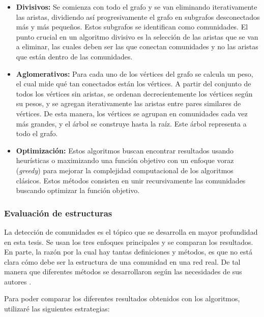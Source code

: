 \begin{enumerate}
\begin{itemize}
\item \textbf{Divisivos:} Se comienza con todo el grafo y se van eliminando iterativamente las aristas, dividiendo así progresivamente el grafo en subgrafos desconectados más y más pequeños. Estos subgrafos se identifican como comunidades. El punto crucial en un algoritmo divisivo es la selección de las aristas que se van a eliminar, las cuales deben ser las que conectan comunidades y no las aristas que están dentro de las comunidades. \cite{Radicchi2004DefiningNetworks,Girvan2002CommunityNetworks.,Newman2004FastNetworks}
\item \textbf{Aglomerativos:} Para cada uno de los vértices del grafo se calcula un peso, el cual mide qué tan conectados están los vértices. A partir del conjunto de todos los vértices sin aristas, se ordenan decrecientemente los vértices según su pesos, y se agregan iterativamente las aristas entre pares similares de vértices. De esta manera, los vértices se agrupan en comunidades cada vez más grandes, y el árbol se construye hasta la raíz. Este árbol representa a todo el grafo. \cite{Radicchi2004DefiningNetworks,Pons2005ComputingWalks}
\item \textbf{Optimización:} Estos algoritmos buscan encontrar resultados usando heurísticas o maximizando una función objetivo con un enfoque voraz (\textit{greedy}) para mejorar la complejidad computacional de los algoritmos clásicos. Estos métodos consisten en unir recursivamente las comunidades buscando optimizar la función objetivo.\cite{Clauset2004FindingNetworks,Blondel2008FastNetworks}
\end{itemize}
  
\end{enumerate}

\subsubsection{Evaluación de estructuras}
La detección de comunidades es el tópico que se desarrolla en mayor profundidad en esta tesis. Se usan los tres enfoques principales y se comparan los resultados. En parte, la razón por la cual hay tantas definiciones y métodos, es que no está clara cómo debe ser la estructura de una comunidad en una red real. De tal manera que diferentes métodos se desarrollaron según las necesidades de sus autores \cite{Tang2010}.

Para poder comparar los diferentes resultados obtenidos con los algoritmos, utilizaré las siguientes estrategias:

